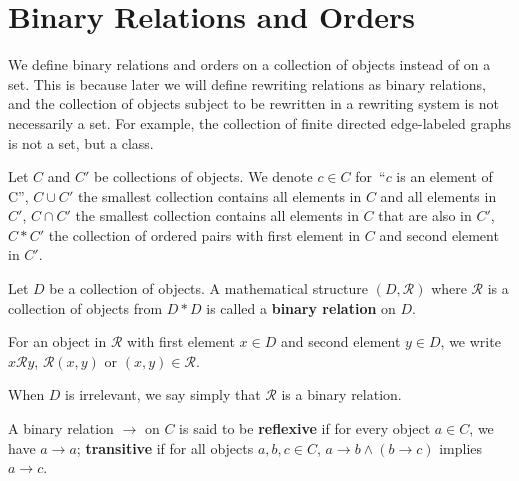
\chapter{Binary Relations and Orders}

We define binary relations and orders on a collection of objects instead of on a set. This is because later we will define rewriting relations as binary relations, and the collection of objects subject to be rewritten in a rewriting system is not necessarily a set. For example, the collection of finite directed edge-labeled graphs is not a set, but a class.

\begin{notation}
    Let $C$ and $C'$ be collections of objects. We denote $c \in C$ for~\enquote{$c$ is an element of C}, $C \cup C'$ the smallest collection contains all elements in $C$ and all elements in $C'$, $C \cap C'$ the smallest collection contains all elements in $C$ that are also in $C'$, $C * C'$ the collection of ordered pairs with first element in $C$ and second element in $C'$.  
  \end{notation} 
  
  \begin{definition}
    \label{def:binary_relation:binary_relation}
    Let $D$ be a collection of objects. A mathematical structure \( (D, \mathcal{R}) \) where $\mathcal{R}$ is a collection of objects from $D * D$ is called a \textbf{binary relation} on $D$. 
    
    For an object in $\mathcal{R}$ with first element $x \in D$ and second element $y\in D$, we write $x \mathcal{R} y$, $\mathcal{R}(x,y)$ or $(x,y) \in \mathcal{R}$. 
    
    When $D$ is irrelevant, we say simply that $\mathcal{R}$ is a binary relation.
  \end{definition} 
   
  \begin{definition}
    \label{def:binary_relation:reflexivity_transitivity}
    A binary relation \( \to \) on \(C\) is said to be \textbf{reflexive} if for every object \(a \in C\), we have \(a \to a\); \textbf{transitive} if for all objects \( a, b, c \in C\), \( a \to b \land (b \to c) \) implies \(a \to c\).
  \end{definition}
  
